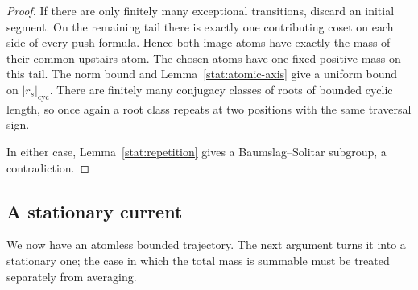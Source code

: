 \begin{proof}
If there are only finitely many exceptional transitions, discard an
initial segment.  On the remaining tail there is exactly one
contributing coset on each side of every push formula.  Hence both
image atoms have exactly the mass of their common upstairs atom.
The chosen atoms have one fixed positive mass on this tail.  The norm
bound and Lemma~\ref{stat:atomic-axis} give a uniform bound on
$|r_s|_{\mathrm{cyc}}$.  There are finitely many conjugacy classes of
roots of bounded cyclic length, so once again a root class repeats at
two positions with the same traversal sign.

In either case, Lemma~\ref{stat:repetition} gives a Baumslag--Solitar
subgroup, a contradiction.
\end{proof}

\subsection{A stationary current}

We now have an atomless bounded trajectory.  The next argument turns
it into a stationary one; the case in which the total mass is summable
must be treated separately from averaging.

